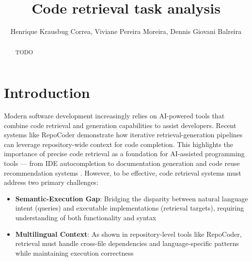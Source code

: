 \documentclass[12pt]{article}
\title{Code retrieval task analysis}
\author{Henrique Krausbug Correa\inst{1}, Viviane Pereira Moreira\inst{1}, Dennis Giovani Balreira\inst{1}}
\begin{document}
 

\maketitle


\begin{abstract}
  TODO
\end{abstract}
     

\section{Introduction}




Modern software development increasingly relies on AI-powered tools that combine code retrieval and generation capabilities to assist developers.
Recent systems like RepoCoder \cite{Zhang2023} demonstrate how iterative retrieval-generation pipelines can leverage repository-wide context for code completion.
This highlights the importance of precise code retrieval as a foundation for AI-assisted programming tools — from IDE autocompletion to documentation generation and code reuse recommendation systems \cite{Ziegler2022}.
However, to be effective, code retrieval systems must address two primary challenges:

\begin{itemize}
  \item \textbf{Semantic-Execution Gap}: Bridging the disparity between natural language intent (queries) and executable implementations (retrieval targets), requiring understanding of both functionality and syntax \cite{Wan2019}
  \item \textbf{Multilingual Context}: As shown in repository-level tools like RepoCoder, retrieval must handle cross-file dependencies and language-specific patterns while maintaining execution correctness
\end{itemize}
\end{document}
